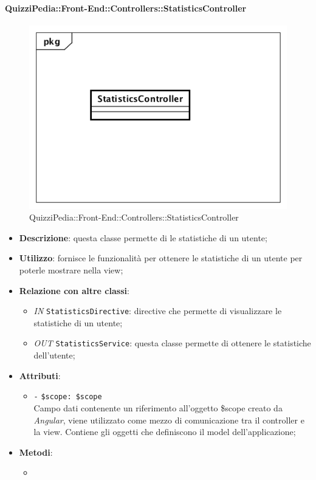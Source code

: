 \paragraph{QuizziPedia::Front-End::Controllers::StatisticsController}
\begin{figure} [ht]
	\centering
	\includegraphics[scale=0.45]{UML/Classi/Front-End/QuizziPedia_Front-end_Controller_StatisticsController.png}
	\caption{QuizziPedia::Front-End::Controllers::StatisticsController}
\end{figure} \FloatBarrier
\begin{itemize}
	\item \textbf{Descrizione}: questa classe permette di le statistiche di un utente;
	\item \textbf{Utilizzo}: fornisce le funzionalità per ottenere le statistiche di un utente per poterle mostrare nella view;
	\item \textbf{Relazione con altre classi}:
	\begin{itemize}
		\item \textit{IN} \texttt{StatisticsDirective}: directive che permette di visualizzare le statistiche di un utente; 
		\item \textit{OUT} \texttt{StatisticsService}: questa classe permette di ottenere le statistiche dell'utente;
	\end{itemize}
	\item \textbf{Attributi}:
	\begin{itemize}
		\item \texttt{-} \texttt{\$scope: \$scope} \\
		Campo dati contenente un riferimento all’oggetto \$scope creato da \textit{Angular}, viene utilizzato come mezzo di comunicazione tra il controller e la view. Contiene gli oggetti che definiscono il model dell’applicazione;
	\end{itemize}
	\item \textbf{Metodi}:
	\begin{itemize}
		\item 
	\end{itemize}
\end{itemize}

